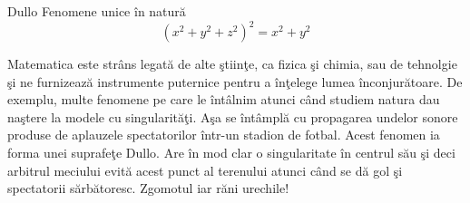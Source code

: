 \begin{surferPage}{Dullo}
Fenomene unice \^in natur\u a\\
\smallskip
\[(x^2+ y^2+ z^2)^2	= x^2+ y^2\]

\singlespacing
Matematica este str\^ans legat\u a de alte \c stiin\c te, ca fizica \c si chimia, sau de tehnolgie \c si ne furnizeaz\u a instrumente puternice pentru a 
\^in\c telege lumea \^inconjur\u atoare.
\singlespacing
De exemplu, multe fenomene pe care le \^int\^alnim atunci c\^and studiem natura dau na\c stere la modele cu singularit\u a\c ti.
\singlespacing
A\c sa se \^int\^ampl\u a  cu propagarea undelor sonore produse de aplauzele spectatorilor \^intr-un stadion de fotbal.
Acest fenomen ia forma unei suprafe\c te Dullo. Are \^in mod clar o singularitate \^in centrul s\u au \c si deci arbitrul meciului evit\u a 
acest punct al terenului atunci c\^and se d\u a gol \c si spectatorii s\u arb\u atoresc. Zgomotul iar r\u ani urechile!
\end{surferPage}